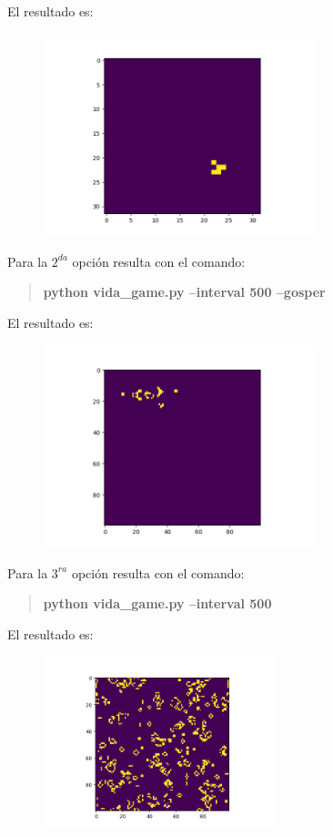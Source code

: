 \documentclass[a4paper,12pt]{article}
\newcommand{\eq}[1]{$#1$}
\begin{document}
El resultado es:
\begin{figure}[h]
    \centering
    \includegraphics[width=0.7\textwidth]{glide_option.png}
\end{figure}
\clearpage
Para la \eq{2^{da}} opción resulta con el comando:
\begin{quotation}
    \centering
    {\bfseries \ttfamily python vida\_game.py --interval 500 --gosper}
\end{quotation}

El resultado es:
\begin{figure}[h]
    \centering
    \includegraphics[width=0.7\textwidth]{gosper_option.png}
\end{figure}

Para la \eq{3^{ra}} opción resulta con el comando:
\begin{quotation}
    \centering
    {\bfseries \ttfamily python vida\_game.py --interval 500}
\end{quotation}

El resultado es:
\begin{figure}[h]
    \centering
    \includegraphics[width=0.6\textwidth]{random_option.png}
\end{figure}
\end{document}
